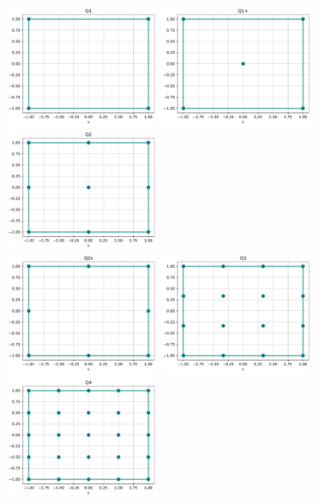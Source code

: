 \begin{center}
\includegraphics[width=5cm]{python_codes/fieldstone_120/spaces/Q1_nodes}
\includegraphics[width=5cm]{python_codes/fieldstone_120/spaces/Q1+_nodes}
\includegraphics[width=5cm]{python_codes/fieldstone_120/spaces/Q2_nodes}\\
\includegraphics[width=5cm]{python_codes/fieldstone_120/spaces/Q2s_nodes}
\includegraphics[width=5cm]{python_codes/fieldstone_120/spaces/Q3_nodes}
\includegraphics[width=5cm]{python_codes/fieldstone_120/spaces/Q4_nodes}\\

\end{center}
